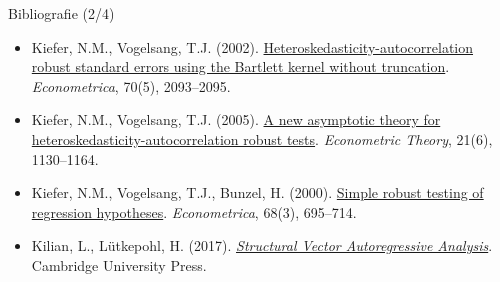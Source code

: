 \begin{frame}{Bibliografie (2/4)}
\begin{itemize}
    \item Kiefer, N.M., Vogelsang, T.J. (2002). \href{https://doi.org/10.1111/1468-0262.00366}{Heteroskedasticity-autocorrelation robust standard errors using the Bartlett kernel without truncation}. \emph{Econometrica}, 70(5), 2093--2095.
    \item Kiefer, N.M., Vogelsang, T.J. (2005). \href{https://doi.org/10.1017/S0266466605050565}{A new asymptotic theory for heteroskedasticity-autocorrelation robust tests}. \emph{Econometric Theory}, 21(6), 1130--1164.
    \item Kiefer, N.M., Vogelsang, T.J., Bunzel, H. (2000). \href{https://doi.org/10.1111/1468-0262.00128}{Simple robust testing of regression hypotheses}. \emph{Econometrica}, 68(3), 695--714.
    \item Kilian, L., Lütkepohl, H. (2017). \href{https://doi.org/10.1017/9781108164818}{\emph{Structural Vector Autoregressive Analysis}}. Cambridge University Press.
\end{itemize}
\end{frame}

